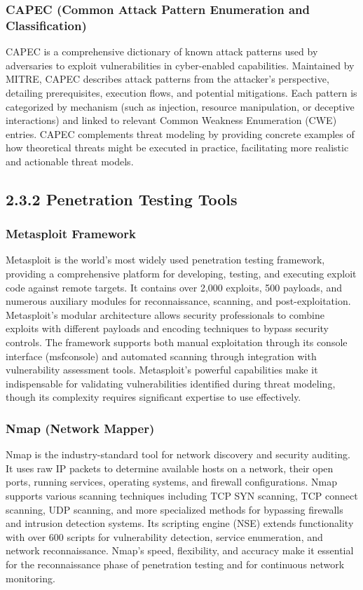 \documentclass[12pt,a4paper]{report}
\begin{document}
\subsubsection{CAPEC (Common Attack Pattern Enumeration and Classification)}

CAPEC is a comprehensive dictionary of known attack patterns used by adversaries to exploit vulnerabilities in cyber-enabled capabilities. Maintained by MITRE, CAPEC describes attack patterns from the attacker's perspective, detailing prerequisites, execution flows, and potential mitigations. Each pattern is categorized by mechanism (such as injection, resource manipulation, or deceptive interactions) and linked to relevant Common Weakness Enumeration (CWE) entries. CAPEC complements threat modeling by providing concrete examples of how theoretical threats might be executed in practice, facilitating more realistic and actionable threat models.

\subsection{2.3.2 Penetration Testing Tools}

\subsubsection{Metasploit Framework}

Metasploit is the world's most widely used penetration testing framework, providing a comprehensive platform for developing, testing, and executing exploit code against remote targets. It contains over 2,000 exploits, 500 payloads, and numerous auxiliary modules for reconnaissance, scanning, and post-exploitation. Metasploit's modular architecture allows security professionals to combine exploits with different payloads and encoding techniques to bypass security controls. The framework supports both manual exploitation through its console interface (msfconsole) and automated scanning through integration with vulnerability assessment tools. Metasploit's powerful capabilities make it indispensable for validating vulnerabilities identified during threat modeling, though its complexity requires significant expertise to use effectively.

\subsubsection{Nmap (Network Mapper)}

Nmap is the industry-standard tool for network discovery and security auditing. It uses raw IP packets to determine available hosts on a network, their open ports, running services, operating systems, and firewall configurations. Nmap supports various scanning techniques including TCP SYN scanning, TCP connect scanning, UDP scanning, and more specialized methods for bypassing firewalls and intrusion detection systems. Its scripting engine (NSE) extends functionality with over 600 scripts for vulnerability detection, service enumeration, and network reconnaissance. Nmap's speed, flexibility, and accuracy make it essential for the reconnaissance phase of penetration testing and for continuous network monitoring.
\end{document}
